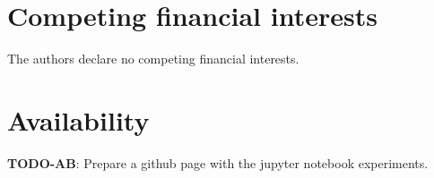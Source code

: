 \documentclass{article}
\newcommand{\todo}[2]{{\color{red} {\bf TODO-#1}: #2}}
\begin{document}
\section*{Competing financial interests}
The authors declare no competing financial interests.


\section*{Availability}
\todo{AB}{Prepare a github page with the jupyter notebook experiments.}

%


\end{document}
